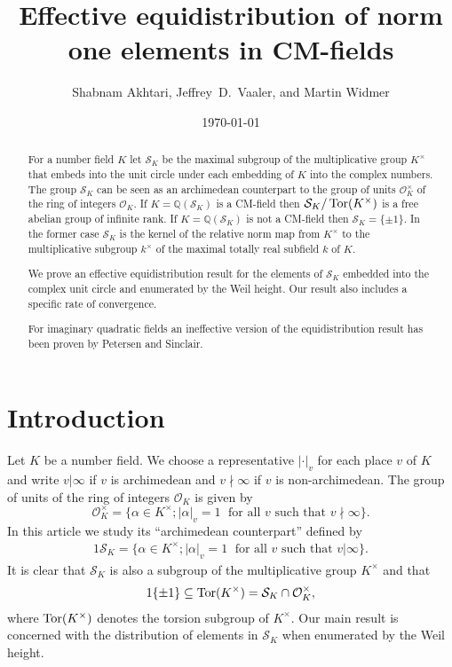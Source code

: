 \documentclass[11pt]{amsart}
\title{Effective equidistribution of norm one elements in CM-fields}
\author{Shabnam Akhtari, Jeffrey~D.~Vaaler, and Martin Widmer}
\numberwithin{equation}{eqncounter}
\def\IQ{\mathbb Q}
\def\Tor{\mathop{\rm Tor}\nolimits}
\def\Oseen{{\mathcal{O}}}
\def\Sc{\mathcal{S}}
\begin{document}
\date{\today}



\maketitle


\begin{abstract}
For a number field $K$ let $\Sc_K$ be the maximal  subgroup of the multiplicative group $K^\times$
that embeds into the unit circle under each embedding of $K$ into the complex numbers. 
The group $\Sc_K$ can be seen as an archimedean counterpart to the group of units  
$\Oseen_K^\times$ of the ring of integers $\Oseen_K$. If $K=\IQ(\Sc_K)$ is a CM-field then 
$\Sc_K/\Tor(K^\times)$ is a free abelian group of infinite rank.
If $K=\IQ(\Sc_K)$ is not a CM-field then $\Sc_K=\{\pm 1\}$. 
In the former case $\Sc_K$ is the kernel of the relative norm map from $K^\times$
to the multiplicative subgroup $k^\times$ of the maximal totally real subfield $k$ of $K$. 


We prove an effective equidistribution result for the elements of $\Sc_K$ embedded into the
complex unit circle and enumerated by the Weil height. Our result also includes
a specific rate of convergence.


For imaginary quadratic fields an ineffective version of the equidistribution result  has been proven by Petersen and Sinclair.
\end{abstract}



\section{Introduction}
Let $K$ be a  number field. We choose a representative $|\cdot|_v$ for each place $v$ of $K$ and write $v|\infty$ if $v$ is archimedean and $v\nmid \infty$ if $v$ is non-archimedean. The group of units of the ring of integers $\Oseen_K$ is given by
$$\Oseen_K^\times=\{\alpha\in K^{\times}; |\alpha|_v=1 \; \text{ for all $v$ such that } v\nmid \infty \}.$$
In this article we study its ``archimedean counterpart'' defined by
\begin{alignat*}1
\Sc_K=\{\alpha\in K^{\times}; |\alpha|_v=1 \; \text{ for all $v$ such that } v|\infty \}.
\end{alignat*}
It is clear that $\Sc_K$ is also a subgroup of the multiplicative group $K^\times$ and that
\begin{alignat}1\label{eq:TorSK}
\{\pm1\}\subseteq \Tor(K^\times)=\Sc_K\cap \Oseen_K^\times,
\end{alignat}
where $\Tor(K^\times)$ denotes the torsion subgroup of $K^\times$.
Our main result is concerned with the distribution of elements in $\Sc_K$ when enumerated by the Weil height. 
\end{document}
